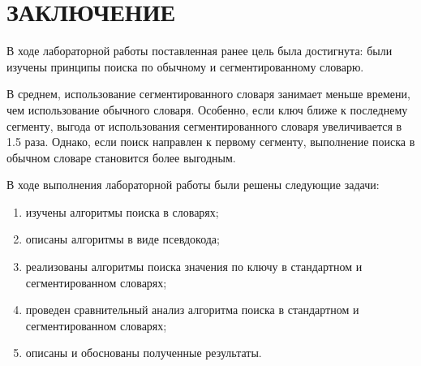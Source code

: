 \chapter*{ЗАКЛЮЧЕНИЕ}

В ходе лабораторной работы поставленная ранее цель была достигнута:
были изучены принципы поиска по обычному и сегментированному словарю. 

В среднем, использование сегментированного словаря занимает меньше времени, чем использование обычного словаря. Особенно, если ключ ближе к последнему сегменту, выгода от использования сегментированного словаря увеличивается в 1.5 раза. Однако, если поиск направлен к первому сегменту, выполнение поиска в обычном словаре становится более выгодным.

В ходе выполнения лабораторной работы были решены следующие задачи:

\begin{enumerate}
    \item изучены алгоритмы поиска в словарях;
    \item описаны алгоритмы в виде псевдокода;
    \item реализованы алгоритмы поиска значения по ключу в стандартном и сегментированном словарях;
    \item проведен сравнительный анализ алгоритма поиска в стандартном и сегментированном словарях;
    \item описаны и обоснованы полученные результаты.
\end{enumerate}
